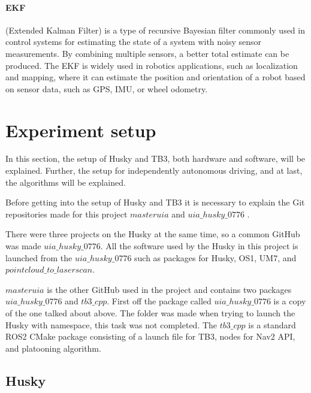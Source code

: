 \paragraph{EKF} (Extended Kalman Filter) is a type of recursive Bayesian filter commonly used in control systems for estimating the state of a system with noisy sensor measurements. By combining multiple sensors, a better total estimate can be produced. The EKF is widely used in robotics applications, such as localization and mapping, where it can estimate the position and orientation of a robot based on sensor data, such as GPS, IMU, or wheel odometry.


\section{Experiment setup}
In this section, the setup of Husky and TB3, both hardware and software, will be explained. Further, the setup 
for independently autonomous driving, and at last, the algorithms will be explained. 


Before getting into the setup of Husky and TB3 it is necessary to explain the Git repositories made for this project $masteruia$ \cite{masteruia} and $uia\_husky\_0776$ \cite{uiahusky}. 

There were three projects on the Husky at the same time, so a common GitHub was made $uia\_husky\_0776$. All the software used by the Husky in this project is launched from the $uia\_husky\_0776$ such as packages for Husky, OS1, UM7, and $pointcloud\_to\_laserscan$.

$masteruia$ is the other GitHub used in the project and contains two packages $uia\_husky\_0776$ and $tb3\_cpp$.
First off the package called $uia\_husky\_0776$ is a copy of the one talked about above. The folder was made when trying to launch the Husky with namespace, this task was not completed. 
The $tb3\_cpp$ is a standard ROS2 CMake package consisting of a launch file for TB3, nodes for Nav2 API, and platooning algorithm. 
                      
\subsection{Husky}
